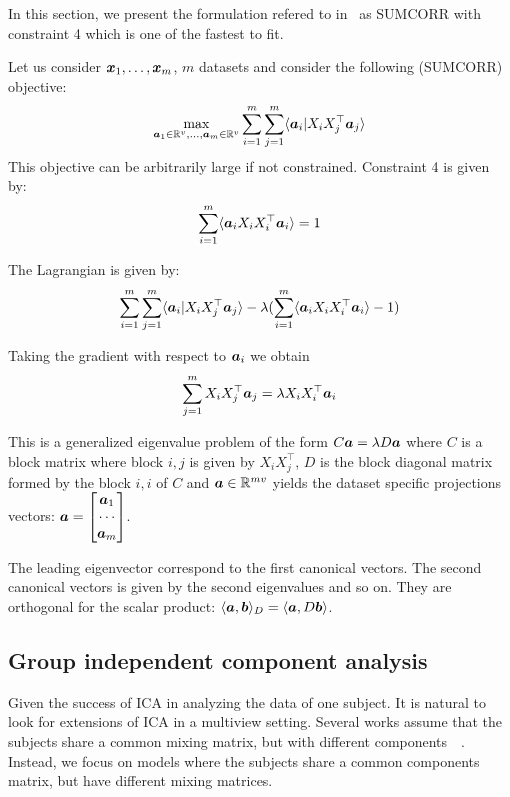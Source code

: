 In this section, we present the formulation refered to
in~\cite{nielsen2002multiset} as SUMCORR with constraint 4 which is one of the
fastest to fit.

Let us consider $\boldsymbol{x}_1, \dots, \boldsymbol{x}_m$, $m$ datasets and consider the following (SUMCORR)
objective:
\begin{align}
  \max_{\boldsymbol{a}_1 \in \mathbb{R}^{v}, \dots, \boldsymbol{a}_m \in \mathbb{R}^{v}} \sum_{i=1}^m \sum_{j=1}^m \langle \boldsymbol{a}_i | X_i X_j^{\top} \boldsymbol{a}_j \rangle
\end{align}
This objective can be arbitrarily large if not constrained. Constraint 4 is
given by:
\begin{align}
  \sum_{i=1}^m \langle \boldsymbol{a}_i X_i X_i^{\top} \boldsymbol{a}_i \rangle = 1
\end{align}

The Lagrangian is given by:
\begin{align}
  \sum_{i=1}^m \sum_{j=1}^m \langle \boldsymbol{a}_i | X_i X_j^{\top} \boldsymbol{a}_j \rangle - \lambda (\sum_{i=1}^m \langle \boldsymbol{a}_i X_i X_i^{\top} \boldsymbol{a}_i \rangle - 1)
\end{align}

Taking the gradient with respect to $\boldsymbol{a}_i$ we obtain
\begin{align}
  \sum_{j=1}^m X_i X_j^{\top} \boldsymbol{a}_j = \lambda X_i X_i^{\top} \boldsymbol{a}_i
\end{align}

This is a generalized eigenvalue problem of the form $C \boldsymbol{a} = \lambda D \boldsymbol{a}$
where $C$ is a block matrix where block $i,j$ is given by $X_i X_j^{\top}$, 
$D$ is the block diagonal matrix formed by the block $i, i$ of $C$ and $\boldsymbol{a} \in
\mathbb{R}^{mv}$ yields the dataset specific projections vectors: $\boldsymbol{a} = \begin{bmatrix} \boldsymbol{a}_1 \\ \cdots \\
  \boldsymbol{a}_m \end{bmatrix}$.

    The leading eigenvector correspond to the first canonical vectors. The
    second canonical vectors is given by the second eigenvalues and so on. They
    are orthogonal for the scalar product: $\langle \boldsymbol{a}, \boldsymbol{b}  \rangle_D =
    \langle \boldsymbol{a}, D \boldsymbol{b}  \rangle$.

  
\subsection{Group independent component analysis}
\label{sec:groupica}
Given the success of ICA in analyzing the data of one subject. It is natural to
look for extensions of ICA in a multiview setting.
Several works assume that the subjects share a common mixing matrix, but with different components~\cite{pfister2019robustifying}~\cite{svensen2002ica}.
% 
Instead, we focus on models where the subjects share a common components matrix, but have different mixing matrices.

